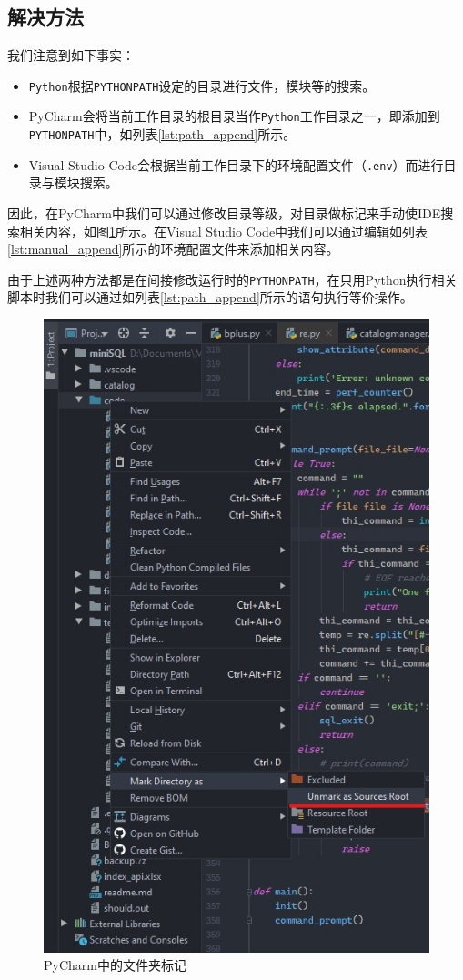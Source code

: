 \documentclass[UTF8]{ctexrep} %
\begin{document}
\subsection{解决方法}
我们注意到如下事实：
\begin{itemize}
    \item \texttt{Python}根据\texttt{PYTHONPATH}设定的目录进行文件，模块等的搜索。
    \item PyCharm会将当前工作目录的根目录当作\texttt{Python}工作目录之一，即添加到\texttt{PYTHONPATH}中，如列表\ref{lst:path_append}所示。
    \item Visual Studio Code会根据当前工作目录下的环境配置文件（\texttt{.env}）而进行目录与模块搜索。
\end{itemize}

因此，在PyCharm中我们可以通过修改目录等级，对目录做标记来手动使IDE搜索相关内容，如图\ref{fig:folder_label}所示。在Visual Studio Code中我们可以通过编辑如列表\ref{lst:manual_append}所示的环境配置文件来添加相关内容。
\par
由于上述两种方法都是在间接修改运行时的\texttt{PYTHONPATH}，在只用Python执行相关脚本时我们可以通过如列表\ref{lst:path_append}所示的语句执行等价操作。

\begin{figure}[H]
    \centering
    \includegraphics[width=0.4\linewidth]{figure/path_append.jpg}
    \caption{PyCharm中的文件夹标记}
    \label{fig:folder_label}
\end{figure}
\end{document}
